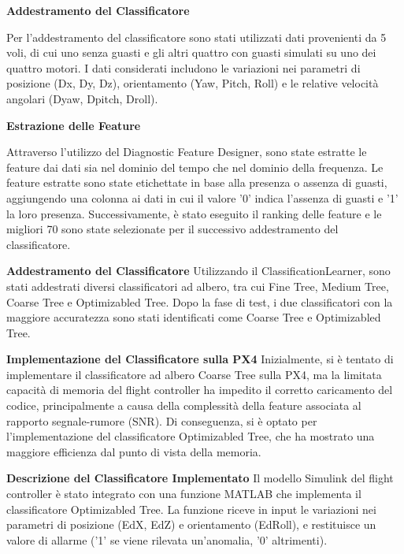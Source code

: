 \textbf{Addestramento del Classificatore}

Per l'addestramento del classificatore sono stati utilizzati dati provenienti da 5 voli, di cui uno senza guasti e gli altri quattro con guasti simulati su uno dei quattro motori. I dati considerati includono le variazioni nei parametri di posizione (Dx, Dy, Dz), orientamento (Yaw, Pitch, Roll) e le relative velocità angolari (Dyaw, Dpitch, Droll).

\textbf{Estrazione delle Feature}

Attraverso l'utilizzo del Diagnostic Feature Designer, sono state estratte le feature dai dati sia nel dominio del tempo che nel dominio della frequenza. Le feature estratte sono state etichettate in base alla presenza o assenza di guasti, aggiungendo una colonna ai dati in cui il valore '0' indica l'assenza di guasti e '1' la loro presenza. Successivamente, è stato eseguito il ranking delle feature e le migliori 70 sono state selezionate per il successivo addestramento del classificatore.

\textbf{Addestramento del Classificatore}
Utilizzando il ClassificationLearner, sono stati addestrati diversi classificatori ad albero, tra cui Fine Tree, Medium Tree, Coarse Tree e Optimizabled Tree. Dopo la fase di test, i due classificatori con la maggiore accuratezza sono stati identificati come Coarse Tree e Optimizabled Tree.

\textbf{Implementazione del Classificatore sulla PX4}
Inizialmente, si è tentato di implementare il classificatore ad albero Coarse Tree sulla PX4, ma la limitata capacità di memoria del flight controller ha impedito il corretto caricamento del codice, principalmente a causa della complessità della feature associata al rapporto segnale-rumore (SNR). Di conseguenza, si è optato per l'implementazione del classificatore Optimizabled Tree, che ha mostrato una maggiore efficienza dal punto di vista della memoria.

\textbf{Descrizione del Classificatore Implementato}
Il modello Simulink del flight controller è stato integrato con una funzione MATLAB che implementa il classificatore Optimizabled Tree. La funzione riceve in input le variazioni nei parametri di posizione (EdX, EdZ) e orientamento (EdRoll), e restituisce un valore di allarme ('1' se viene rilevata un'anomalia, '0' altrimenti).